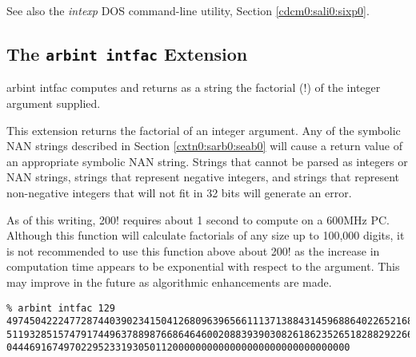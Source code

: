 \begin{tclcommandseealso}
See also the \emph{intexp} DOS command-line utility, 
Section \cdcmzeroxrefhyphen{}\ref{cdcm0:sali0:sixp0}.
\end{tclcommandseealso}


\subsection{The \texttt{arbint intfac} Extension}
\label{cxtn0:sarb0:sfac0}

\begin{tclcommandname}{arbint intfac}%
computes and returns as a string the factorial ($!$) of
the integer argument supplied.
\end{tclcommandname}

\begin{tclcommandsynopsis}
\end{tclcommandsynopsis}

\begin{tclcommanddescription}
This extension returns the factorial of an integer argument.
Any of the symbolic NAN strings described in 
Section \ref{cxtn0:sarb0:seab0} will cause a return
value of an appropriate symbolic NAN string.
Strings that cannot be parsed as integers or 
NAN strings, strings 
that represent negative integers, and strings that represent
non-negative integers that will not fit in 32 bits will generate
an error.

As of this writing, 200! requires about 1 second to compute on a
600MHz PC.  Although this function will calculate factorials of any size
up to 100,000 digits, it is not recommended to use this function above 
about 200! as the increase in computation time appears to be exponential
with respect to the argument.  This may improve in the future as algorithmic
enhancements are made.
\end{tclcommanddescription}

\begin{tclcommandsampleinvocations}
\begin{scriptsize}
\begin{verbatim}
% arbint intfac 129
4974504222477287440390234150412680963965661113713884314596886402265216893219635
5119328515747917449637889876686464600208839390308261862352651828829226610077151
044469167497022952331930501120000000000000000000000000000000
\end{verbatim}
\end{scriptsize}
\end{tclcommandsampleinvocations}

